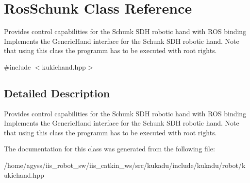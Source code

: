 \hypertarget{classRosSchunk}{}\section{Ros\+Schunk Class Reference}
\label{classRosSchunk}


Provides control capabilities for the Schunk S\+DH robotic hand with R\+OS binding Implements the Generic\+Hand interface for the Schunk S\+DH robotic hand. Note that using this class the programm has to be executed with root rights.  




{\ttfamily \#include $<$kukiehand.\+hpp$>$}



\subsection{Detailed Description}
Provides control capabilities for the Schunk S\+DH robotic hand with R\+OS binding Implements the Generic\+Hand interface for the Schunk S\+DH robotic hand. Note that using this class the programm has to be executed with root rights. 

The documentation for this class was generated from the following file\+:\begin{DoxyCompactItemize}
\item 
/home/agyss/iis\+\_\+robot\+\_\+sw/iis\+\_\+catkin\+\_\+ws/src/kukadu/include/kukadu/robot/kukiehand.\+hpp\end{DoxyCompactItemize}
